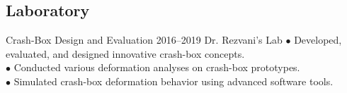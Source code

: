 \documentclass[
	a4paper,
]{ThirtyNinesecondscv}
\begin{document}





\newpage
\makebacksidebar


\subsection{Laboratory}
\begin{cvtable}[1.5]
    \customcvitem
            {\faUniversity}
            {Crash-Box Design and Evaluation} 
            {2016--2019}
            {Dr.  Rezvani's Lab}
            {$\bullet$ Developed, evaluated, and designed innovative crash-box concepts.\\
     $\bullet$ Conducted various deformation analyses on crash-box prototypes. \\
     $\bullet$ Simulated crash-box deformation behavior using advanced software tools.}
\end{cvtable}
\end{document}
